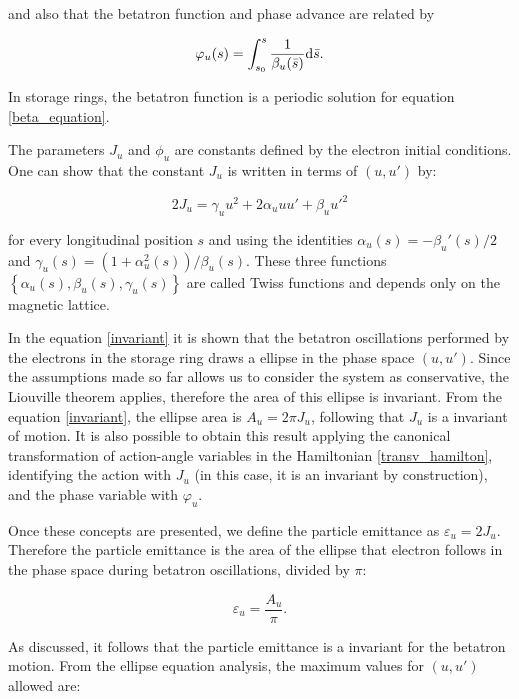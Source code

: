 and also that the betatron function and phase advance are related by

\begin{equation}
\varphi_u(s) = \int_{s_0}^{s} \dfrac{1}{\beta_u(\bar{s})} \mathrm{d} \bar{s}.
\end{equation}

In storage rings, the betatron function is a periodic solution for equation \eqref{beta_equation}.

The parameters $J_u$ and $\phi_u$ are constants defined by the electron initial conditions. One can show that the constant $J_u$ is written in terms of $(u, u')$ by:

\begin{equation}
    2J_u = \gamma_u u^2 + 2 \alpha_u u u' + \beta_u {u'}^2
    \label{invariant}
\end{equation}

for every longitudinal position $s$ and using the identities $\alpha_u(s) = -\beta_u'(s)/2$ and $\gamma_u(s) = (1 + \alpha_u^2(s))/\beta_u(s)$. These three functions $\left\{\alpha_u(s), \beta_u(s), \gamma_u(s)\right\}$ are called Twiss functions and depends only on the magnetic lattice.

In the equation \eqref{invariant} it is shown that the betatron oscillations performed by the electrons in the storage ring draws a ellipse in the phase space $(u, u')$. Since the assumptions made so far allows us to consider the system as conservative, the Liouville theorem applies, therefore the area of this ellipse is invariant. From the equation \eqref{invariant}, the ellipse area is $A_u = 2 \pi J_u$, following that $J_u$ is a invariant of motion. It is also possible to obtain this result applying the canonical transformation of action-angle variables in the Hamiltonian \eqref{transv_hamilton}, identifying the action with $J_u$ (in this case, it is an invariant by construction), and the phase variable with $\varphi_u$.

Once these concepts are presented, we define the particle emittance as $\varepsilon_u = 2J_u$. Therefore the particle emittance is the area of the ellipse that electron follows in the phase space during betatron oscillations, divided by $\pi$:

\begin{equation}
    \varepsilon_u = \frac{A_u}{\pi}.
\end{equation}

As discussed, it follows that the particle emittance is a invariant for the betatron motion. From the ellipse equation analysis, the maximum values for $(u, u')$ allowed are:

